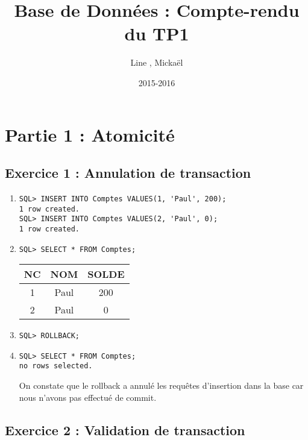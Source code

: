 \documentclass{article}
\title{Base de Données : Compte-rendu du TP1}
\author{Line \bsc{POUVARET}, Mickaël \bsc{TURNEL}}
\date{2015-2016}
\begin{document}
\maketitle
\section*{Partie 1 : Atomicité}

\subsection*{Exercice 1 : Annulation de transaction}
	
\begin{enumerate}[label=\arabic*)]
	\item 
		\begin{lstlisting}
SQL> INSERT INTO Comptes VALUES(1, 'Paul', 200); 
1 row created.
SQL> INSERT INTO Comptes VALUES(2, 'Paul', 0);
1 row created.
		\end{lstlisting}

	\item 
		\begin{lstlisting}
SQL> SELECT * FROM Comptes;
		\end{lstlisting}
\begin{tabular}{|c|c|c|}
	\hline
        	NC & NOM & SOLDE \\
	\hline        
 	1 & Paul & 200 \\
	\hline         
	2 & Paul & 0 \\
	\hline
\end{tabular}

	\item 
		\begin{lstlisting}
SQL> ROLLBACK;
		\end{lstlisting}

	\item
		\begin{lstlisting}
SQL> SELECT * FROM Comptes;
no rows selected.
		\end{lstlisting}

On constate que le rollback a annulé les requêtes d'insertion dans la base car nous n'avons pas effectué de commit.

\end{enumerate}

\subsection*{Exercice 2 : Validation de transaction}
\end{document}
